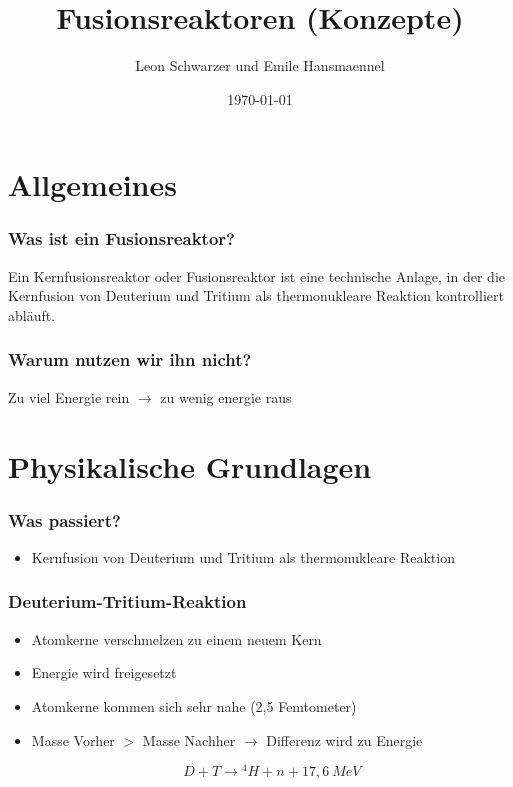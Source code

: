 \documentclass[aspectratio=169]{beamer}
\title{Fusionsreaktoren (Konzepte)}
\subtitle{}
\author{Leon Schwarzer und Emile Hansmaennel}
\institute{Theodor-Fliedner-Gymnasium}
\date{\today}
\begin{document}
  \begin{frame}
    \titlepage
  \end{frame}

  \section{Allgemeines}
    \begin{frame}
      \frametitle{Was ist ein Fusionsreaktor?}
      Ein Kernfusionsreaktor oder Fusionsreaktor ist eine
      technische Anlage, in der die Kernfusion von Deuterium und Tritium als
      thermonukleare Reaktion kontrolliert abläuft.
    \end{frame}

    \begin{frame}
      \frametitle{Warum nutzen wir ihn nicht?}
      Zu viel Energie rein \( \rightarrow \) zu wenig energie raus
    \end{frame}

  \section{Physikalische Grundlagen}
    \begin{frame}
      \frametitle{Was passiert?}
      \begin{itemize}
        \item Kernfusion von Deuterium und Tritium als thermonukleare Reaktion
      \end{itemize}
    \end{frame}

    \begin{frame}
      \frametitle{Deuterium-Tritium-Reaktion}
      \begin{itemize}
        \item Atomkerne verschmelzen zu einem neuem Kern
        \item Energie wird freigesetzt
        \item Atomkerne kommen sich sehr nahe (2,5 Femtometer)
        \item Masse Vorher \( > \) Masse Nachher \( \rightarrow \) Differenz wird zu Energie

        \begin{equation}
          D + T \rightarrow {}^4 H + n + 17,6~MeV
        \end{equation}

      \end{itemize}
    \end{frame}
\end{document}
